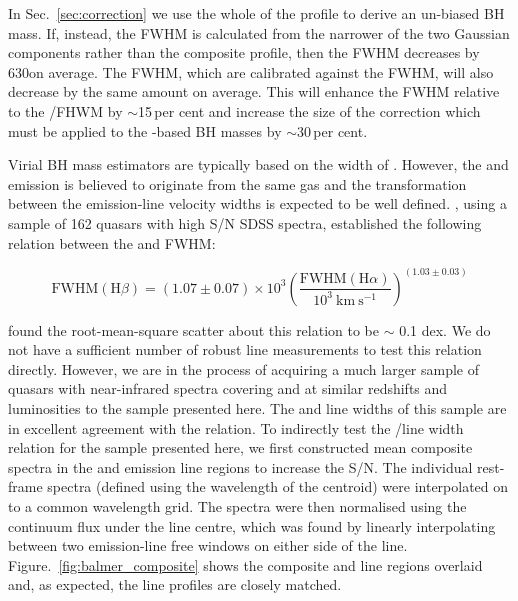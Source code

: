 In Sec.~\ref{sec:correction} we use the whole of the \hb profile to derive an un-biased BH mass.  
If, instead, the FWHM is calculated from the narrower of the two Gaussian components rather than the composite profile, then the \hb FWHM decreases by 630\kms on average.
The \ha FWHM, which are calibrated against the \hb FWHM, will also decrease by the same amount on average. 
This will enhance the  FWHM relative to the \hans/\hb FHWM by $\sim$15\,per cent and increase the size of the correction which must be applied to the -based BH masses by $\sim$30\,per cent.  

Virial BH mass estimators are typically based on the width of \hbns. 
However, the \ha and \hb emission is believed to originate from the same gas and the transformation between the emission-line velocity widths is expected to be well defined. 
\citet{greene05}, using a sample of 162 quasars with high S/N SDSS spectra, established the following relation between the \ha and \hb FWHM:

\begin{equation}
  \label{eq:hb2hawidth}
  \text{FWHM}(\text{H}\beta) = (1.07 \pm 0.07) \times 10^3 \left( \frac{ \text{FWHM}(\text{H}\alpha) }{10^3 ~\text{km}~\text{s}^{-1} } \right)^{(1.03 \pm 0.03)}
\end{equation}

\citet{greene05} found the root-mean-square scatter about this relation to be $\sim$ 0.1 dex. 
We do not have a sufficient number of robust \hb line measurements to test this relation directly.
However, we are in the process of acquiring a much larger sample of quasars with near-infrared spectra covering \ha and \hb at similar redshifts and luminosities to the sample presented here. 
The \ha and \hb line widths of this sample are in excellent agreement with the \citet{greene05} relation. 
To indirectly test the \hans/\hb line width relation for the sample presented here, we first constructed mean composite spectra in the \ha and \hb emission line regions to increase the S/N. 
The individual rest-frame spectra (defined using the wavelength of the \ha centroid) were interpolated on to a common wavelength grid. 
The spectra were then normalised using the continuum flux under the line centre, which was found by linearly interpolating between two emission-line free windows on either side of the line. 
Figure.~\ref{fig:balmer_composite} shows the composite \ha and \hb line regions overlaid and, as expected, the line profiles are closely matched.

